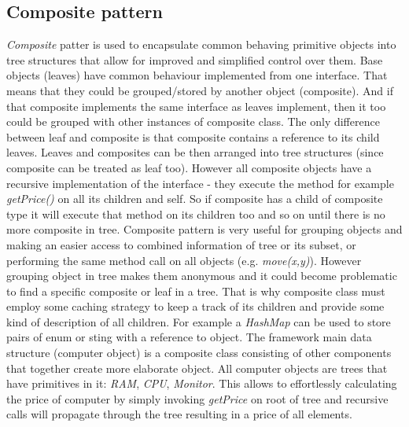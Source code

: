 \documentclass[pdftex,11pt,a4paper]{article}
\begin{document}
\subsection{Composite pattern}
\emph{Composite} patter is used to encapsulate common behaving primitive objects into tree structures that allow for improved and simplified control over them. Base objects (leaves) have common behaviour implemented from one interface. That means that they could be grouped/stored by another object (composite). And if that composite implements the same interface as leaves implement, then it too could be grouped with other instances of composite class. The only difference between leaf and composite is that composite contains a reference to its child leaves.
Leaves and composites can be then arranged into tree structures (since composite can be treated as leaf too). However all composite objects have a recursive implementation of the interface - they execute the method for example \emph{getPrice()} on all its children and self. So if composite has a child of composite type it will execute that method on its children too and so on until there is no more composite in tree. 
Composite pattern is very useful for grouping objects and making an easier access to combined information of tree or its subset, or performing the same method call on all objects (e.g. \emph{move(x,y)}). 
However grouping object in tree makes them anonymous and it could become problematic to find a specific composite or leaf in a tree. That is why composite class must employ some caching strategy to keep a track of its children and provide some kind of description of all children. For example a \emph{HashMap} can be used to store pairs of enum or sting with a reference to object.
The framework main data structure (computer object) is a composite class consisting of other components that together create more elaborate object. All computer objects are trees that have primitives in it: \emph{RAM}, \emph{CPU}, \emph{Monitor}. This allows to effortlessly calculating the price of computer by simply invoking \emph{getPrice} on root of tree and recursive calls will propagate through the tree resulting in a price of all elements.
\end{document}

